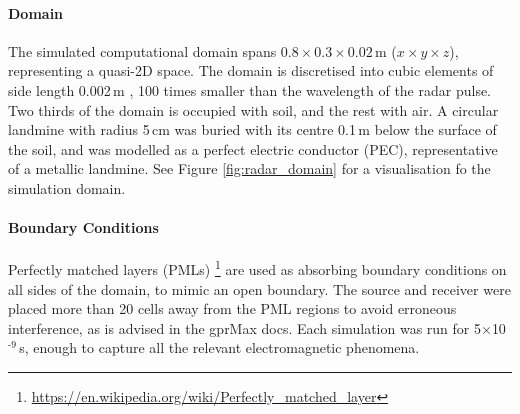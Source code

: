         \paragraph{Domain}

            \noindent The simulated computational domain spans $0.8\times 0.3\times0.02$\,m ($x\times y\times z$), representing a quasi-2D space. The domain is discretised into cubic elements of side length 0.002\,m , 100 times smaller than the wavelength of the radar pulse. Two thirds of the domain is occupied with soil, and the rest with air. A circular landmine with radius 5\,cm was buried with its centre 0.1\,m below the surface of the soil, and was modelled as a perfect electric conductor (PEC), representative of a metallic landmine. See Figure \ref{fig:radar_domain} for a visualisation fo the simulation domain.


        \paragraph{Boundary Conditions}
        
            \noindent Perfectly matched layers (PMLs) \footnote{\url{https://en.wikipedia.org/wiki/Perfectly_matched_layer}} are used as absorbing boundary conditions on all sides of the domain, to mimic an open boundary. The source and receiver were placed more than 20 cells away from the PML regions to avoid erroneous interference, as is advised in the gprMax docs. Each simulation was run for 5$\times$10$^{\text{-9}}$\,s, enough to capture all the relevant electromagnetic phenomena.

